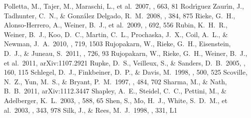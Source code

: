 \documentclass[apj]{emulateapj}
\begin{document}
\begin{thebibliography}{}
 Polletta, M., Tajer, M.,
  Maraschi, L., et al.\ 2007, \apj, 663, 81
  Rodr{\'{\i}}guez Zaur{\'{\i}}n, J., Tadhunter, C.~N., \&
  Gonz{\'a}lez Delgado, R.~M.\ 2008, \mnras, 384, 875
 Rieke, G.~H., Alonso-Herrero, A.,
  Weiner, B.~J., et al.\ 2009, \apj, 692, 556
 Rubin, K.~H.~R., Weiner, B.~J.,
  Koo, D.~C., Martin, C.~L., Prochaska, J.~X., Coil, A.~L., \& Newman,
  J.~A.\ 2010, \apj, 719, 1503
 Rujopakarn, W.,
  Rieke, G.~H., Eisenstein, D.~J., \& Juneau, S.\ 2011, \apj, 726, 93
 Rujopakarn, W., Rieke, G.~H.,
  Weiner, B.~J., et al.\ 2011, arXiv:1107.2921
 Rupke, D.~S., Veilleux, S., \&
  Sanders, D.~B.\ 2005, \apjs, 160, 115 %
 Schlegel, D.~J., Finkbeiner,
  D.~P., \& Davis, M.\ 1998, \apj, 500, 525
 Scoville, N.~Z., Yun, M.~S., \&
  Bryant, P.~M.\ 1997, \apj, 484, 702
 Sharma, M., \& Nath,
  B.~B.\ 2011, arXiv:1112.3447
 Shapley, A.~E., Steidel, C.~C.,
  Pettini, M., \& Adelberger, K.~L.\ 2003, \apj, 588, 65
 Shen, S., Mo, H.~J., White,
  S.~D.~M., et al.\ 2003, \mnras, 343, 978
 Silk, J., \& Rees, M.~J.\ 1998,
  \aap, 331, L1

\end{thebibliography}
\end{document}
